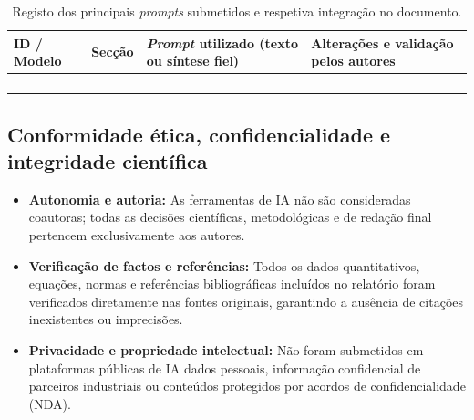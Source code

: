 \begin{table}[H]
\centering\small
\caption{Registo dos principais \textit{prompts} submetidos e respetiva integração no documento.}
\label{tab:prompts_ia}
\begin{tabularx}{\textwidth}{L{0.16\textwidth} L{0.11\textwidth} L{0.40\textwidth} Y}
  \toprule
  \sffamily\bfseries\textcolor{uadark}{ID / Modelo} &
  \sffamily\bfseries\textcolor{uadark}{Secção} &
  \sffamily\bfseries\textcolor{uadark}{\textit{Prompt} utilizado (texto ou síntese fiel)} &
  \sffamily\bfseries\textcolor{uadark}{Alterações e validação pelos autores} \\
  \midrule
   &  &  &  \\ \hline
   &  &  &  \\ \hline
  & & & \\
  \bottomrule
\end{tabularx}
\end{table}

\subsection{Conformidade ética, confidencialidade e integridade científica}

\begin{itemize}[leftmargin=1.4em, itemsep=4pt, topsep=4pt]
  \item \textbf{Autonomia e autoria:} As ferramentas de IA não são consideradas coautoras; todas as decisões científicas, metodológicas e de redação final pertencem exclusivamente aos autores.
  \item \textbf{Verificação de factos e referências:} Todos os dados quantitativos, equações, normas e referências bibliográficas incluídos no relatório foram verificados diretamente nas fontes originais, garantindo a ausência de citações inexistentes ou imprecisões.
  \item \textbf{Privacidade e propriedade intelectual:} Não foram submetidos em plataformas públicas de IA dados pessoais, informação confidencial de parceiros industriais ou conteúdos protegidos por acordos de confidencialidade (NDA).
\end{itemize}

